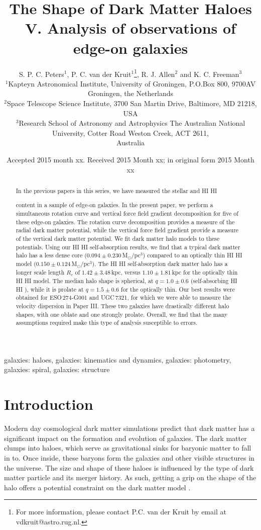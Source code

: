 \documentclass[useAMS,usenatbib]{mn2e}
\title[The Shape of Dark Matter Haloes V.]{The Shape of Dark Matter Haloes\\
V. Analysis of observations of edge-on galaxies}
\author[S. P. C. Peters et al.]{S. P. C. Peters$^{1}$,
P. C. van der Kruit$^{1}$\thanks{For more information, please contact P.C. van der Kruit by email at vdkruit@astro.rug.nl.}, 
R. J. Allen$^{2}$ and K. C. Freeman$^{3}$\\
$^{1}$Kapteyn Astronomical Institute, University of Groningen, P.O.Box 800, 9700AV Groningen, the Netherlands\\
$^{2}$Space Telescope Science Institute, 3700 San Martin Drive, Baltimore, MD 21218, USA\\
$^{3}$Research School of Astronomy and Astrophysics The Australian National University, Cotter Road Weston Creek, ACT 2611,\\
Australia}
\newcommand{\hi}{%
  \relax
  \ifmmode
    \textrm{\textsc{HI}}
  \else
    \textsc{H{\smaller}I}
  \fi
}
\begin{document}
\date{Accepted 2015 month xx. Received 2015 Month xx; in original form 2015 Month xx}
\pagerange{\pageref{firstpage}--\pageref{lastpage}} 



\maketitle

\label{firstpage}

\begin{abstract}
In the previous papers in this series, we have measured the stellar and \hi 
content in a sample of edge-on galaxies.
In the present paper, we perform a simultaneous rotation curve and vertical 
force field gradient decomposition for five of these edge-on galaxies. 
The rotation curve decomposition provides a measure of the radial dark matter 
potential, while the vertical force field gradient provide a measure of the 
vertical dark matter potential.
We fit dark matter halo models to these potentials.
Using our \hi self-absorption results, we find that a typical dark matter 
halo has a less dense core ($0.094\pm0.230$\,M$_\odot$/pc$^3$) compared to 
an optically thin \hi model ($0.150\pm0.124$\,M$_\odot$/pc$^3$).
The \hi self-absorption dark matter halo has a longer scale length $R_c$ 
of $1.42\pm 3.48$\,kpc, versus $1.10\pm 1.81$\,kpc for the optically thin 
\hi model.
The median halo shape is spherical, at $q=1.0\pm0.6$ (self-absorbing \hi), 
while it is prolate at $q=1.5\pm0.6$ for the optically thin.
Our best results were obtained for ESO\,274-G001 and UGC\,7321, for which 
we were able to measure the velocity dispersion in Paper III. 
These two galaxies have drastically different halo shapes, 
with one oblate and one strongly prolate.
Overall, we find that the many assumptions required make this 
type of analysis susceptible to errors.
\end{abstract}

\begin{keywords}
galaxies: haloes, galaxies: kinematics and dynamics, galaxies: photometry,
galaxies: spiral, galaxies: structure
\end{keywords}


\section{Introduction}\label{sec:dmintro}
Modern day cosmological dark matter simulations predict that dark 
matter has a significant impact on the formation and evolution of galaxies.
The dark matter clumps into haloes, which serve as gravitational 
sinks for baryonic matter to fall in to.
Once inside, these baryons form the galaxies and other visible 
structures in the universe.
The size and shape of these haloes is influenced by the type of 
dark matter particle and its merger history.
As such, getting a grip on the shape of the halo offers a 
potential constraint on the dark matter model \citep{Davis1985A}.
\end{document}
